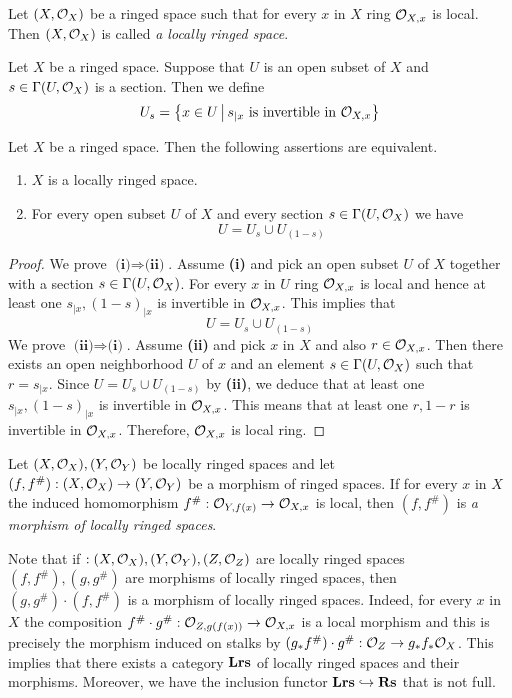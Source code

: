 \begin{definition}
Let $(X,{\mathcal O}_X)$ be a ringed space such that for every $x$ in $X$ ring ${\mathcal O}_{X,x}$ is local. Then $(X,{\mathcal O}_X)$ is called \textit{a locally ringed space}.
\end{definition}
\noindent
Let $X$ be a ringed space. Suppose that $U$ is an open subset of $X$ and $s\in \Gamma(U,{\mathcal O}_X)$ is a section. Then we define
$$U_s = \big\{x\in U\,\big|\,s_{\mid x}\mbox{ is invertible in }{\mathcal O}_{X,x}\big\}$$

\begin{fact}\label{fact:characterizationoflocallyringed}
Let $X$ be a ringed space. Then the following assertions are equivalent.
\begin{enumerate}[label=\emph{\textbf{(\roman*)}}, leftmargin=1.5em]
\item $X$ is a locally ringed space.
\item For every open subset $U$ of $X$ and every section $s\in \Gamma(U,{\mathcal O}_X)$ we have
$$U = U_s\cup U_{(1-s)}$$
\end{enumerate}
\end{fact}
\begin{proof}
We prove $\textbf{(i)} \Rightarrow \textbf{(ii)}$. Assume \textbf{(i)} and pick an open subset $U$ of $X$ together with a section $s\in \Gamma(U,{\mathcal O}_X)$. For every $x$ in $U$ ring ${\mathcal O}_{X,x}$ is local and hence at least one $s_{\mid x}, (1-s)_{\mid x}$ is invertible in ${\mathcal O}_{X,x}$. This implies that
$$U = U_s\cup U_{(1-s)}$$
We prove $\textbf{(ii)} \Rightarrow \textbf{(i)}$. Assume \textbf{(ii)} and pick $x$ in $X$ and also $r\in {\mathcal O}_{X,x}$. Then there exists an open neighborhood $U$ of $x$ and an element $s\in \Gamma(U,{\mathcal O}_X)$ such that $r = s_{\mid x}$. Since $U = U_s\cup U_{(1-s)}$ by \textbf{(ii)}, we deduce that at least one $s_{\mid x}, (1-s)_{\mid x}$ is invertible in ${\mathcal O}_{X,x}$. This means that at least one $r, 1-r$ is invertible in ${\mathcal O}_{X,x}$. Therefore, ${\mathcal O}_{X,x}$ is local ring.
\end{proof}

\begin{definition}
Let $(X,{\mathcal O}_X), (Y,{\mathcal O}_Y)$ be locally ringed spaces and let $(f,f^{\#}):(X,{\mathcal O}_X)\rightarrow (Y,{\mathcal O}_Y)$ be a morphism of ringed spaces. If for every $x$ in $X$ the induced homomorphism $f^{\#}:{\mathcal O}_{Y,f(x)}\rightarrow {\mathcal O}_{X,x}$ is local, then $(f,f^{\#})$ is \textit{a morphism of locally ringed spaces}.
\end{definition}
\noindent
Note that if $:(X,{\mathcal O}_X),(Y,{\mathcal O}_Y),(Z,{\mathcal O}_Z)$ are locally ringed spaces $(f,f^{\#}),(g,g^{\#})$ are morphisms of locally ringed spaces, then $(g,g^{\#})\cdot (f,f^{\#})$ is a morphism of locally ringed spaces. Indeed, for every $x$ in $X$ the composition $f^{\#}\cdot g^{\#}:{\mathcal O}_{Z,g(f(x))}\rightarrow {\mathcal O}_{X,x}$ is a local morphism and this is precisely the morphism induced on stalks by $(g_*f^{\#})\cdot g^{\#}:{\mathcal O}_Z\rightarrow g_*f_*{\mathcal O}_X$. This implies that there exists a category $\mathbf{Lrs}$ of locally ringed spaces and their morphisms. Moreover, we have the inclusion functor $\mathbf{Lrs}\hookrightarrow \mathbf{Rs}$ that is not full.

